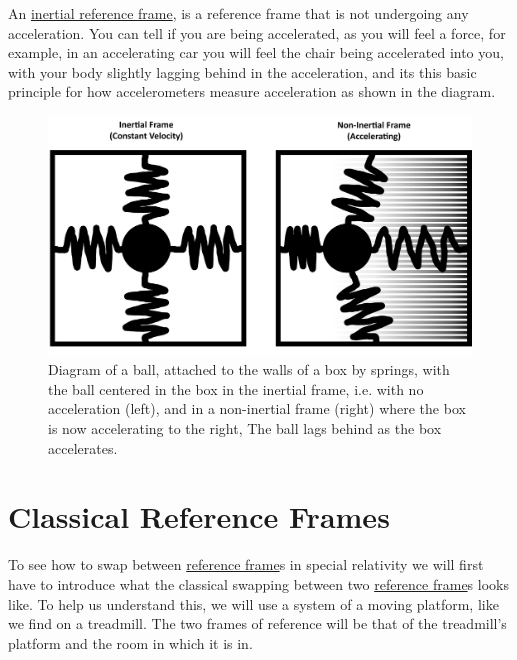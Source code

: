 An \hyperlink{def-Inertial-reference-frame}{inertial reference frame}, is a reference frame that is not undergoing any acceleration. You can tell if you are being accelerated, as you will feel a force, for example, in an accelerating car you will feel the chair being accelerated into you, with your body slightly lagging behind in the acceleration, and its this basic principle for how accelerometers measure acceleration as shown in the diagram.

\begin{figure}[H]
	\centering
	\includegraphics[width=\textwidth]{images/pdf/Spring_boxes.pdf}
	\caption{Diagram of a ball, attached to the walls of a box by springs, with the ball centered in the box in the inertial frame, i.e. with no acceleration (left), and in a non-inertial frame (right) where the box is now accelerating to the right, The ball lags behind as the box accelerates.}
	\label{fig: spring boxes}
\end{figure}


\section{Classical Reference Frames}

To see how to swap between \hyperlink{def-Reference-frame}{reference frame}s in special relativity we will first have to introduce what the classical swapping between two \hyperlink{def-Reference-frame}{reference frame}s looks like. To help us understand this, we will use a system of a moving platform, like we find on a treadmill. The two frames of reference will be that of the treadmill's platform and the room in which it is in.

